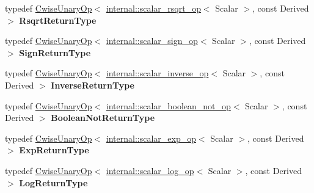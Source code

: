 \begin{DoxyCompactItemize}
\item 
\mbox{\label{class_eigen_1_1_array_base_a14505c8e100cb5ecdf7f4e2227b4100e}} 
typedef \mbox{\hyperlink{class_eigen_1_1_cwise_unary_op}{Cwise\+Unary\+Op}}$<$ \mbox{\hyperlink{struct_eigen_1_1internal_1_1scalar__rsqrt__op}{internal\+::scalar\+\_\+rsqrt\+\_\+op}}$<$ Scalar $>$, const Derived $>$ {\bfseries Rsqrt\+Return\+Type}
\item 
\mbox{\label{class_eigen_1_1_array_base_a8c45bb6cf97156e9d03761f59665ae43}} 
typedef \mbox{\hyperlink{class_eigen_1_1_cwise_unary_op}{Cwise\+Unary\+Op}}$<$ \mbox{\hyperlink{struct_eigen_1_1internal_1_1scalar__sign__op}{internal\+::scalar\+\_\+sign\+\_\+op}}$<$ Scalar $>$, const Derived $>$ {\bfseries Sign\+Return\+Type}
\item 
\mbox{\label{class_eigen_1_1_array_base_a48620f80c7d7c494b0640bde07af0331}} 
typedef \mbox{\hyperlink{class_eigen_1_1_cwise_unary_op}{Cwise\+Unary\+Op}}$<$ \mbox{\hyperlink{struct_eigen_1_1internal_1_1scalar__inverse__op}{internal\+::scalar\+\_\+inverse\+\_\+op}}$<$ Scalar $>$, const Derived $>$ {\bfseries Inverse\+Return\+Type}
\item 
\mbox{\label{class_eigen_1_1_array_base_a22194485978527c0dc3c933e3f38562c}} 
typedef \mbox{\hyperlink{class_eigen_1_1_cwise_unary_op}{Cwise\+Unary\+Op}}$<$ \mbox{\hyperlink{struct_eigen_1_1internal_1_1scalar__boolean__not__op}{internal\+::scalar\+\_\+boolean\+\_\+not\+\_\+op}}$<$ Scalar $>$, const Derived $>$ {\bfseries Boolean\+Not\+Return\+Type}
\item 
\mbox{\label{class_eigen_1_1_array_base_a3f369dfd77a66a7db6ebe7c7813a5e51}} 
typedef \mbox{\hyperlink{class_eigen_1_1_cwise_unary_op}{Cwise\+Unary\+Op}}$<$ \mbox{\hyperlink{struct_eigen_1_1internal_1_1scalar__exp__op}{internal\+::scalar\+\_\+exp\+\_\+op}}$<$ Scalar $>$, const Derived $>$ {\bfseries Exp\+Return\+Type}
\item 
\mbox{\label{class_eigen_1_1_array_base_a7bb13734001ef1219e54b05c86706bbf}} 
typedef \mbox{\hyperlink{class_eigen_1_1_cwise_unary_op}{Cwise\+Unary\+Op}}$<$ \mbox{\hyperlink{struct_eigen_1_1internal_1_1scalar__log__op}{internal\+::scalar\+\_\+log\+\_\+op}}$<$ Scalar $>$, const Derived $>$ {\bfseries Log\+Return\+Type}

\end{DoxyCompactItemize}
